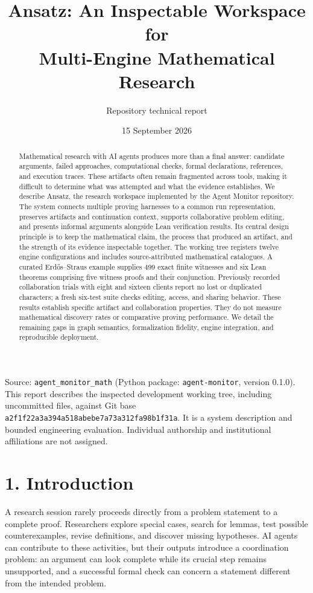 \documentclass[11pt,a4paper]{article}
\title{\textbf{Ansatz: An Inspectable Workspace for\\Multi-Engine Mathematical Research}}
\author{Repository technical report}
\date{15 September 2026}
\begin{document}
\maketitle


Source: \nolinkurl{agent_monitor_math} (Python package: \nolinkurl{agent-monitor}, version 0.1.0). This report describes the inspected development working tree, including uncommitted files, against Git base \nolinkurl{a2f1f22a3a394a518abebe7a73a312fa98b1f31a}. It is a system description and bounded engineering evaluation. Individual authorship and institutional affiliations are not assigned.

\begin{abstract}
Mathematical research with AI agents produces more than a final answer: candidate arguments, failed approaches, computational checks, formal declarations, references, and execution traces. These artifacts often remain fragmented across tools, making it difficult to determine what was attempted and what the evidence establishes. We describe Ansatz, the research workspace implemented by the Agent Monitor repository. The system connects multiple proving harnesses to a common run representation, preserves artifacts and continuation context, supports collaborative problem editing, and presents informal arguments alongside Lean verification results. Its central design principle is to keep the mathematical claim, the process that produced an artifact, and the strength of its evidence inspectable together. The working tree registers twelve engine configurations and includes source-attributed mathematical catalogues. A curated Erd\H{o}s--Straus example supplies 499 exact finite witnesses and six Lean theorems comprising five witness proofs and their conjunction. Previously recorded collaboration trials with eight and sixteen clients report no lost or duplicated characters; a fresh six-test suite checks editing, access, and sharing behavior. These results establish specific artifact and collaboration properties. They do not measure mathematical discovery rates or comparative proving performance. We detail the remaining gaps in graph semantics, formalization fidelity, engine integration, and reproducible deployment.
\end{abstract}

\section*{1. Introduction}

A research session rarely proceeds directly from a problem statement to a complete proof. Researchers explore special cases, search for lemmas, test possible counterexamples, revise definitions, and discover missing hypotheses. AI agents can contribute to these activities, but their outputs introduce a coordination problem: an argument can look complete while its crucial step remains unsupported, and a successful formal check can concern a statement different from the intended problem.
\end{document}
